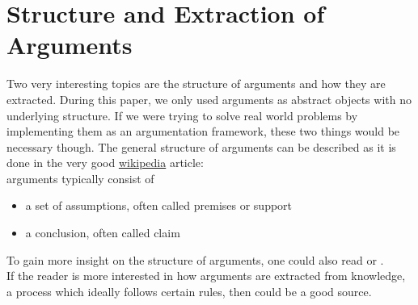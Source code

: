 \documentclass[12pt]{report}
\numberwithin{figure}{chapter}
\theoremstyle{break}
\begin{document}
\section{Structure and Extraction of Arguments}
Two very interesting topics are the structure of arguments and how they are extracted. During this paper, we only used arguments as abstract objects with no underlying structure.
If we were trying to solve real world problems by implementing them as an argumentation framework, these two things would be necessary though.
The general structure of arguments can be described as it is done in the very good 
\href{http://en.wikipedia.org/wiki/Argumentation_theory#Internal_structure_of_arguments}{wikipedia} article:\\
\medskip
arguments typically consist of
\begin{itemize}
	\item{a set of assumptions, often called premises or support}
	\item{a conclusion, often called claim}
\end{itemize}
To gain more insight on the structure of arguments, one could also read \cite{HunterBesnard} or \cite{Prakken}.\\
If the reader is more interested in how arguments are extracted from knowledge, a process which ideally follows certain rules, then \cite{Pollock} could be a good source.

\newpage 
\end{document}
